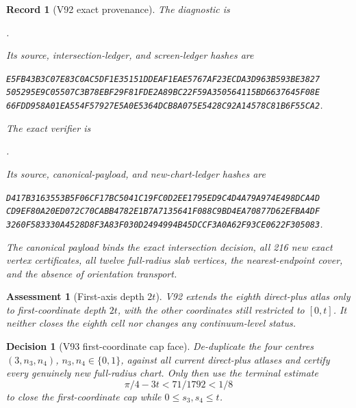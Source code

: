 \documentclass[11pt,oneside]{article}
\newtheorem{assessment}[theorem]{Assessment}
\newtheorem{record}[theorem]{Record}
\newtheorem{decision}[theorem]{Decision}
\theoremstyle{definition}
\theoremstyle{remark}
\begin{document}
\begin{record}[V92 exact provenance]
\label{rec:newv92-provenance}
The diagnostic is
\begin{center}\footnotesize
{}.
\end{center}
Its source, intersection-ledger, and screen-ledger hashes are
\begin{center}\scriptsize
\texttt{E5FB43B3C07E83C0AC5DF1E35151DDEAF1EAE5767AF23ECDA3D963B593BE3827}\\
\texttt{505295E9C05507C3B78EBF29F81FDE2A89BC22F59A350564115BD6637645F08E}\\
\texttt{66FDD958A01EA554F57927E5A0E5364DCB8A075E5428C92A14578C81B6F55CA2}.
\end{center}
The exact verifier is
\begin{center}\footnotesize
{}.
\end{center}
Its source, canonical-payload, and new-chart-ledger hashes are
\begin{center}\scriptsize
\texttt{D417B3163553B5F06CF17BC5041C19FC0D2EE1795ED9C4D4A79A974E498DCA4D}\\
\texttt{CD9EF80A20ED072C70CABB4782E1B7A7135641F088C9BD4EA70877D62EFBA4DF}\\
\texttt{3260F583330A4528D8F3A83F030D2494994B45DCCF3A0A62F93CE0622F305083}.
\end{center}
The canonical payload binds the exact intersection decision, all
216 new exact vertex certificates, all twelve full-radius slab
vertices, the nearest-endpoint cover, and the absence of
orientation transport.
\end{record}

\begin{assessment}[First-axis depth \(2t\)]
\label{ass:newv92}
V92 extends the eighth direct-plus atlas only to first-coordinate
depth \(2t\), with the other coordinates still restricted to
\([0,t]\).  It neither closes the eighth cell nor changes any
continuum-level status.
\end{assessment}

\begin{decision}[V93 first-coordinate cap face]
\label{dec:newv92-next}
De-duplicate the four centres \((3,n_3,n_4)\),
\(n_3,n_4\in\{0,1\}\), against all current direct-plus atlases and
certify every genuinely new full-radius chart.  Only then use the
terminal estimate
\[
 \pi/4-3t<71/1792<1/8                              \tag{92.8}
\]
to close the first-coordinate cap while \(0\leq s_3,s_4\leq t\).
\end{decision}
\end{document}
